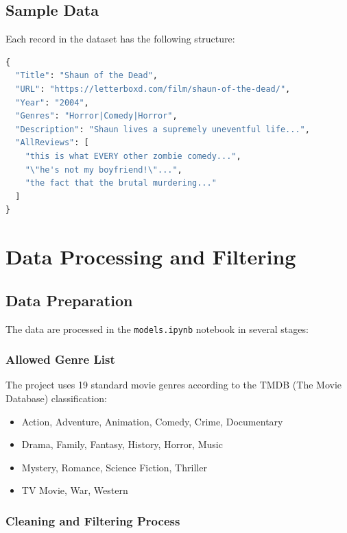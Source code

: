 \documentclass[12pt,a4paper]{article}
\begin{document}
\subsection{Sample Data}

Each record in the dataset has the following structure:

\begin{lstlisting}[language=Python, basicstyle=\small]
{
  "Title": "Shaun of the Dead",
  "URL": "https://letterboxd.com/film/shaun-of-the-dead/",
  "Year": "2004",
  "Genres": "Horror|Comedy|Horror",
  "Description": "Shaun lives a supremely uneventful life...",
  "AllReviews": [
    "this is what EVERY other zombie comedy...",
    "\"he's not my boyfriend!\"...",
    "the fact that the brutal murdering..."
  ]
}
\end{lstlisting}

\section{Data Processing and Filtering}

\subsection{Data Preparation}

The data are processed in the \texttt{models.ipynb} notebook in several stages:

\subsubsection{Allowed Genre List}

The project uses 19 standard movie genres according to the TMDB (The Movie Database) classification:

\begin{itemize}
    \item Action, Adventure, Animation, Comedy, Crime, Documentary
    \item Drama, Family, Fantasy, History, Horror, Music
    \item Mystery, Romance, Science Fiction, Thriller
    \item TV Movie, War, Western
\end{itemize}

\subsubsection{Cleaning and Filtering Process}
\end{document}

